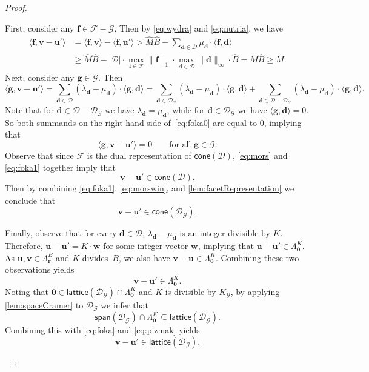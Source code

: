 \documentclass{article}
\renewcommand{\geq}{\geqslant}
\newcommand{\Dd}{\mathcal{D}}
\newcommand{\tup}[1]{{\mathbf{#1}}}
\newcommand{\ww}{\tup w}
\newcommand{\ff}{\tup f}
\renewcommand{\gg}{\tup g}
\newcommand{\rr}{\tup r}
\newcommand{\dd}{\tup d}
\newcommand{\uu}{\tup u}
\newcommand{\myvv}{\tup v} %
\newcommand{\zero}{\tup 0}
\newcommand{\Ff}{\mathcal{F}}
\newcommand{\Gg}{\mathcal{G}}
\newcommand{\sca}[2]{\langle #1,#2\rangle}
\renewcommand{\setminus}{-}
\newcommand{\realcone}{\mathsf{cone}}
\newcommand{\lattice}{\mathsf{lattice}}
\newcommand{\spn}{\mathsf{span}}
\begin{document}
\begin{proof}
\begin{subproof}
 First, consider any $\ff\in \Ff\setminus \Gg$. Then by \cref{eq:wydra} and \cref{eq:nutria}, we have
 \begin{align}
\sca{\ff}{\myvv-\uu'} & =     \sca{\ff}{\myvv}-\sca{\ff}{\uu'} > \widehat{M}\widehat{B}-\sum_{\dd\in \Dd} \mu_\dd\cdot \sca{\ff}{\dd}\nonumber\\
                    & \geq  \widehat{M}\widehat{B}-|\Dd|\cdot \max_{\ff\in \Ff} \|\ff\|_1\cdot \max_{\dd\in \Dd} \|\dd\|_\infty\cdot \widehat{B} =  M\widehat{B} \geq M.\label{eq:mors}
 \end{align}
 Next, consider any $\gg\in \Gg$. Then
 \begin{equation}\label{eq:foka0}
\sca{\gg}{\myvv-\uu'}=\sum_{\dd\in \Dd} (\lambda_\dd-\mu_\dd)\cdot\sca{\gg}{\dd}=\sum_{\dd\in \Dd_\Gg} (\lambda_\dd-\mu_\dd)\cdot\sca{\gg}{\dd} + \sum_{\dd\in \Dd\setminus \Dd_\Gg} (\lambda_\dd-\mu_\dd)\cdot\sca{\gg}{\dd}.
 \end{equation}
 Note that for $\dd\in \Dd\setminus \Dd_\Gg$ we have $\lambda_\dd=\mu_\dd$, while for $\dd\in \Dd_\Gg$ we have $\sca{\gg}{\dd}=0$. So both summands on the right hand side of~\cref{eq:foka0} are equal to $0$, implying that
 \begin{equation}\label{eq:foka1}
\sca{\gg}{\myvv-\uu'}=0\qquad\textrm{for all }\gg\in \Gg.
 \end{equation}
 Observe that since $\Ff$ is the dual representation of $\realcone(\Dd)$, \cref{eq:mors} and \cref{eq:foka1} together imply that
 \begin{equation}\label{eq:morswin}
  \myvv-\uu'\in \realcone(\Dd).
 \end{equation}
 Then by combining \cref{eq:foka1}, \cref{eq:morswin}, and \cref{lem:facetRepresentation} we conclude that
 \begin{equation}\label{eq:foka}
  \myvv-\uu'\in \realcone(\Dd_\Gg).
 \end{equation}

 Finally, observe that for every $\dd\in \Dd$, $\lambda_\dd-\mu_\dd$ is an integer divisible by $K$. Therefore, $\uu-\uu'=K\cdot \ww$ for some integer vector $\ww$, implying that $\uu-\uu'\in \Lambda_{\zero}^{K}$.
 As $\uu,\myvv\in \Lambda_{\rr}^B$ and $K$ divides~$B$, we also have $\myvv-\uu\in \Lambda_{\zero}^{K}$. Combining these two observations yields
 \begin{equation}\label{eq:pizmak}
  \myvv-\uu'\in \Lambda_{\zero}^{K}.
 \end{equation}
 Noting that $\zero \in \lattice(\Dd_\Gg)\cap \Lambda_\zero^{K}$ and $K$ is divisible by $K_\Gg$, by applying \cref{lem:spaceCramer} to $\Dd_\Gg$ we infer that
 $$\spn(\Dd_\Gg)\cap \Lambda_{\zero}^{K}\subseteq \lattice(\Dd_\Gg).$$
 Combining this with \cref{eq:foka} and \cref{eq:pizmak} yields
 \begin{equation}\label{eq:manat}
\myvv-\uu'\in \lattice(\Dd_\Gg).
 \end{equation}


\end{subproof}
\end{proof}
\end{document}
